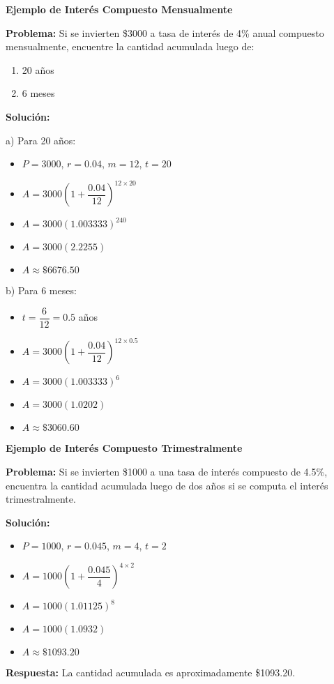 \begin{example}
\textbf{Ejemplo de Interés Compuesto Mensualmente}

\textbf{Problema:} Si se invierten \$3000 a tasa de interés de 4\% anual compuesto mensualmente, encuentre la cantidad acumulada luego de:
\begin{enumerate}[label=\alph*)]
    \item 20 años
    \item 6 meses
\end{enumerate}

\textbf{Solución:}

a) Para 20 años:
\begin{itemize}
    \item $P = 3000$, $r = 0.04$, $m = 12$, $t = 20$
    \item $A = 3000\left(1 + \dfrac{0.04}{12}\right)^{12 \times 20}$
    \item $A = 3000(1.003333)^{240}$
    \item $A = 3000(2.2255)$
    \item $A \approx \$6676.50$
\end{itemize}

b) Para 6 meses:
\begin{itemize}
    \item $t = \dfrac{6}{12} = 0.5$ años
    \item $A = 3000\left(1 + \dfrac{0.04}{12}\right)^{12 \times 0.5}$
    \item $A = 3000(1.003333)^{6}$
    \item $A = 3000(1.0202)$
    \item $A \approx \$3060.60$
\end{itemize}
\end{example}

\begin{example}
\textbf{Ejemplo de Interés Compuesto Trimestralmente}

\textbf{Problema:} Si se invierten \$1000 a una tasa de interés compuesto de 4.5\%, encuentra la cantidad acumulada luego de dos años si se computa el interés trimestralmente.

\textbf{Solución:}
\begin{itemize}
    \item $P = 1000$, $r = 0.045$, $m = 4$, $t = 2$
    \item $A = 1000\left(1 + \dfrac{0.045}{4}\right)^{4 \times 2}$
    \item $A = 1000(1.01125)^{8}$
    \item $A = 1000(1.0932)$
    \item $A \approx \$1093.20$
\end{itemize}

\textbf{Respuesta:} La cantidad acumulada es aproximadamente \$1093.20.
\end{example}

